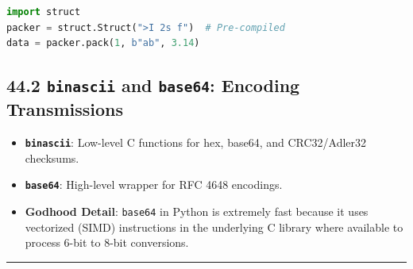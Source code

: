 \begin{lstlisting}[language=Python]
import struct
packer = struct.Struct(">I 2s f")  # Pre-compiled
data = packer.pack(1, b"ab", 3.14)
\end{lstlisting}

\hypertarget{binascii-and-base64-encoding-transmissions}{%
\subsection{\texorpdfstring{44.2 \texttt{binascii} and \texttt{base64}:
Encoding
Transmissions}{44.2 binascii and base64: Encoding Transmissions}}\label{binascii-and-base64-encoding-transmissions}}

\begin{itemize}
\tightlist
\item
  \textbf{\passthrough{\lstinline!binascii!}}: Low-level C functions for
  hex, base64, and CRC32/Adler32 checksums.
\item
  \textbf{\passthrough{\lstinline!base64!}}: High-level wrapper for RFC
  4648 encodings.
\item
  \textbf{Godhood Detail}: \passthrough{\lstinline!base64!} in Python is
  extremely fast because it uses vectorized (SIMD) instructions in the
  underlying C library where available to process 6-bit to 8-bit
  conversions.
\end{itemize}

\begin{center}\rule{0.5\linewidth}{0.5pt}\end{center}
